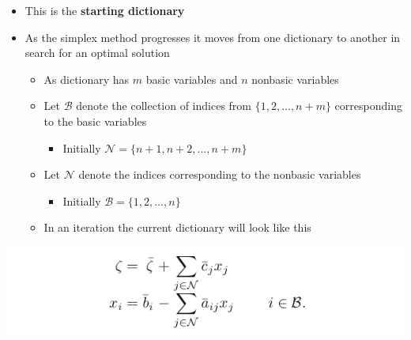 \documentclass[11pt]{article}
\begin{document}
\begin{itemize}
\item This is the \textbf{starting dictionary}
\item As the simplex method progresses it moves from one dictionary to another in search for an optimal solution
\begin{itemize}
\item As dictionary has \(m\) basic variables and \(n\) nonbasic variables
\item Let \(\mathcal B\) denote the collection of indices from \(\{1,2,\dots, n+m\}\) corresponding to the basic variables
\begin{itemize}
\item Initially \(\mathcal N = \{n+1, n+2, \dots, n+m\}\)
\end{itemize}
\item Let \(\mathcal N\) denote the indices corresponding to the nonbasic variables
\begin{itemize}
\item Initially \(\mathcal B = \{1,2, \dots, n\}\)
\end{itemize}
\item In an iteration the current dictionary will look like this
\end{itemize}
\end{itemize}
\begin{center}
\includegraphics[width=.9\linewidth]{The Simplex Method/screenshot_2019-01-28_09-15-11.png}
\end{center}
\end{document}
